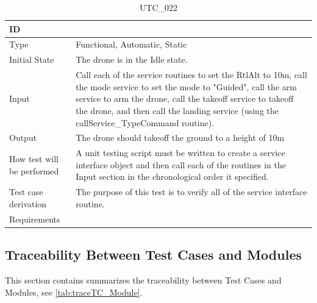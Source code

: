 \documentclass[12pt, titlepage]{article}
\begin{document}
\begin{table}[!h]
\begin{center}
\caption {UTC\_022}
\label{tab:UTC_022}
\begin{tabular}{ | m{3.2cm} | m{12.2cm} | } 
\hline
ID & \nameref{tab:UTC_022} \\ 
\hline
Type &  Functional, Automatic, Static  \\ 
\hline
Initial State & The drone is in the Idle state. \\ 
\hline
Input & Call each of the service routines to set the RtlAlt to 10m, call the mode service to set the mode to "Guided", call the arm service to arm the drone, call the takeoff service to takeoff the drone, and then call the landing service (using the callService_TypeCommand routine). \\ 
\hline
Output &  The drone should takeoff the ground to a height of 10m \\ 
\hline
How test will be performed & A unit testing script must be written to create a service interface object and then call each of the routines in the Input section in the chronological order it specified.\\ 
\hline
Test case derivation & The purpose of this test is to verify all of the service interface routine. \\ 
\hline
Requirements &  \\ 
\hline
\end{tabular}
\end{center}
\end{table}

\subsection{Traceability Between Test Cases and Modules}
This section contains summarizes the traceability between Test Cases and Modules, see \ref{tab:traceTC_Module}. 
\end{document}
